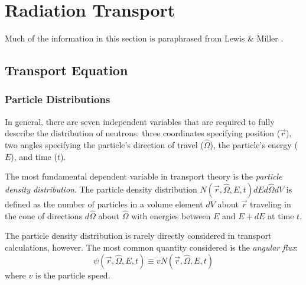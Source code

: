 \section{Radiation Transport}
\label{sec:bg:rt}

Much of the information in this section is paraphrased from Lewis \& Miller \cite{lewis_miller}.

\subsection{Transport Equation}
\label{sec:bg:rt:te}

\subsubsection{Particle Distributions}
\label{sec:bg:rt:te:pd}

In general, there are seven independent variables that are required to fully describe the distribution of neutrons: three coordinates specifying position ($\vec{r}$), two angles specifying the particle's direction of travel ($\hat{\Omega}$), the particle's energy ($E$), and time ($t$).

The most fundamental dependent variable in transport theory is the \textit{particle density distribution}.
The particle density distribution $N\left(\vec{r},\hat{\Omega},E,t\right)dEd\hat{\Omega}dV$ is defined as the number of particles in a volume element $dV$ about $\vec{r}$ traveling in the cone of directions $d\hat{\Omega}$ about $\hat{\Omega}$ with energies between $E$ and $E + dE$ at time $t$.

The particle density distribution is rarely directly considered in transport calculations, however.
The most common quantity considered is the \textit{angular flux}:
\begin{equation}\label{eq:bg:rt:angular-flux}
  \psi\left(\vec{r},\hat{\Omega},E,t\right) \equiv vN\left(\vec{r},\hat{\Omega},E,t\right)
\end{equation}
where $v$ is the particle speed.

